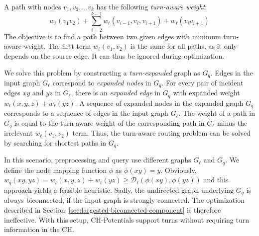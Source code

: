 \documentclass[manuscript,review]{acmart}
\newcommand*{\dist}{\mathcal{D}}
\begin{document}
A path with nodes $v_1, v_2,\ldots v_k$ has the following \emph{turn-aware weight}: \[
w_\ell(v_1 v_2) + \sum_{i=2}^{k-1}  w_t(v_{i-1},v_i,v_{i+1}) + w_\ell(v_i v_{i+1})
\]
The objective is to find a path between two given edges with minimum turn-aware weight.
The first term $w_\ell(v_1, v_2)$ is the same for all paths, as it only depends on the source edge.
It can thus be ignored during optimization.

We solve this problem by constructing a \emph{turn-expanded} graph as $G_q$.
Edges in the input graph $G_\ell$ correspond to \emph{expanded nodes} in $G_q$.
For every pair of incident edges $x y$ and $y z$ in $G_\ell$, there is an \emph{expanded edge} in $G_q$ with expanded weight $w_t(x,y,z) + w_\ell(y z)$.
A sequence of expanded nodes in the expanded graph $G_q$ corresponds to a sequence of edges in the input graph $G_\ell$.
The weight of a path in $G_q$ is equal to the turn-aware weight of the corresponding path in $G_\ell$ minus the irrelevant $w_\ell(v_1,v_2)$ term.
Thus, the turn-aware routing problem can be solved by searching for shortest paths in $G_q$.

In this scenario, preprocessing and query use different graphs $G_\ell$ and $G_q$.
We define the node mapping function $\phi$ as $\phi(x y) = y$.
Obviously, $w_q(xy, yz) = w_t(x,y,z) + w_\ell(y z) \geq \dist_\ell(\phi(x y), \phi(y z))$ and this approach yields a feasible heuristic.
Sadly, the undirected graph underlying $G_q$ is always biconnected, if the input graph is strongly connected.
The optimization described in Section~\ref{sec:largested-biconnected-component} is therefore ineffective.
With this setup, CH-Potentials support turns without requiring turn information in the CH.

\end{document}
